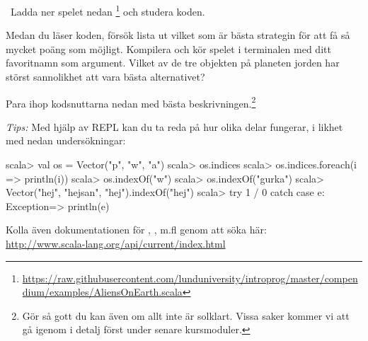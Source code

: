 \Task  \what~Ladda ner spelet nedan \footnote{
\url{https://raw.githubusercontent.com/lunduniversity/introprog/master/compendium/examples/AliensOnEarth.scala}} och studera koden.


%

\Subtask Medan du läser koden, försök lista ut vilket som är bästa strategin för att få så mycket poäng som möjligt. Kompilera och kör spelet i terminalen med ditt favoritnamn som argument. Vilket av de tre objekten på planeten jorden har störst sannolikhet att vara bästa alternativet?

\Subtask Para ihop kodsnuttarna nedan med bästa beskrivningen.\footnote{Gör så gott du kan även om allt inte är solklart. Vissa saker kommer vi att gå igenom i detalj först under senare kursmoduler.}

\begin{ConceptConnections}

\end{ConceptConnections}

\noindent\emph{Tips:} Med hjälp av REPL kan du ta reda på hur olika delar fungerar, i likhet med nedan undersökningar:

\begin{REPL}
scala> val os = Vector("p", "w", "a")
scala> os.indices
scala> os.indices.foreach(i => println(i))
scala> os.indexOf("w")
scala> os.indexOf("gurka")
scala> Vector("hej", "hejsan", "hej").indexOf("hej")
scala> try { 1 / 0 } catch { case e: Exception=> println(e) }
\end{REPL}
Kolla även dokumentationen för , , m.fl genom att söka
här: \\ \url{http://www.scala-lang.org/api/current/index.html}


